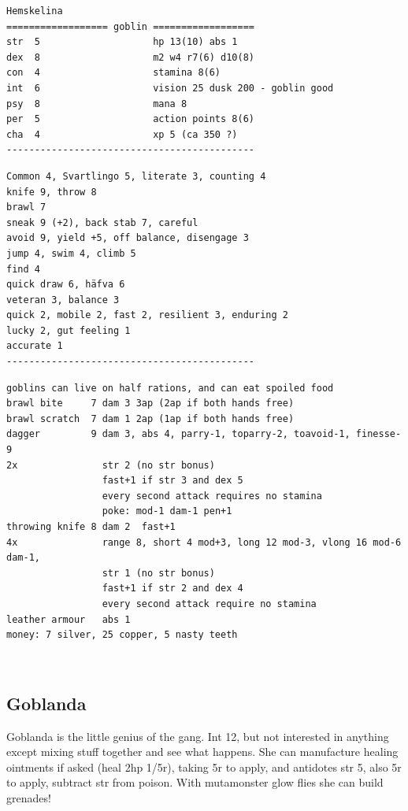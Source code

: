 \goodbreak \small \begin{samepage} \begin{verbatim}
Hemskelina
================== goblin ==================
str  5                    hp 13(10) abs 1
dex  8                    m2 w4 r7(6) d10(8)
con  4                    stamina 8(6)
int  6                    vision 25 dusk 200 - goblin good
psy  8                    mana 8
per  5                    action points 8(6)
cha  4                    xp 5 (ca 350 ?)
--------------------------------------------
\end{verbatim} \end{samepage} \goodbreak \begin{samepage} \begin{verbatim}
Common 4, Svartlingo 5, literate 3, counting 4
knife 9, throw 8
brawl 7
sneak 9 (+2), back stab 7, careful
avoid 9, yield +5, off balance, disengage 3
jump 4, swim 4, climb 5
find 4
quick draw 6, häfva 6
veteran 3, balance 3
quick 2, mobile 2, fast 2, resilient 3, enduring 2
lucky 2, gut feeling 1
accurate 1
--------------------------------------------
\end{verbatim} \end{samepage} \goodbreak \begin{samepage} \begin{verbatim}
goblins can live on half rations, and can eat spoiled food
brawl bite     7 dam 3 3ap (2ap if both hands free)
brawl scratch  7 dam 1 2ap (1ap if both hands free)
dagger         9 dam 3, abs 4, parry-1, toparry-2, toavoid-1, finesse-9
2x               str 2 (no str bonus)
                 fast+1 if str 3 and dex 5
                 every second attack requires no stamina
                 poke: mod-1 dam-1 pen+1
throwing knife 8 dam 2  fast+1
4x               range 8, short 4 mod+3, long 12 mod-3, vlong 16 mod-6 dam-1,
                 str 1 (no str bonus)
                 fast+1 if str 2 and dex 4
                 every second attack require no stamina
leather armour   abs 1
money: 7 silver, 25 copper, 5 nasty teeth
\end{verbatim} \end{samepage} \normalsize



\

\subsection*{Goblanda}

Goblanda is the little genius of the gang. Int 12, but not interested in anything except mixing stuff together and see what happens. She can manufacture healing ointments if asked (heal 2hp 1/5r), taking 5r to apply, and antidotes str 5, also 5r to apply, subtract str from poison. With mutamonster glow flies she can build grenades!

